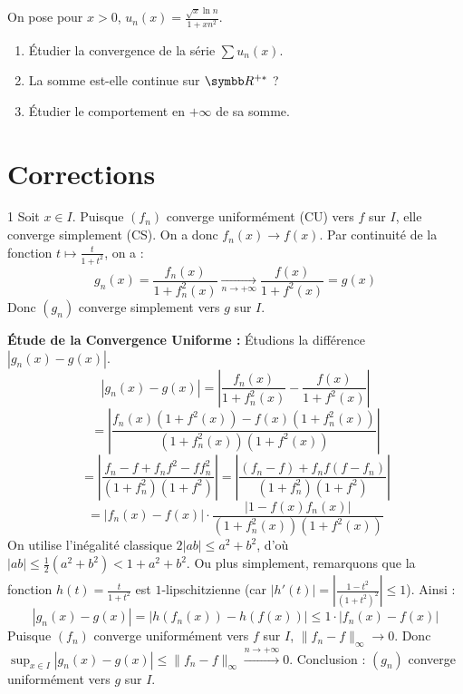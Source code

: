 \begin{exercice}
On pose pour $x>0$, $u_n(x) = \frac{\sqrt{x} \ln n}{1+x n^2}$.
\begin{enumerate}
    \item Étudier la convergence de la série $\sum u_n(x)$.
    \item La somme est-elle continue sur $\R^{+*}$ ?
    \item Étudier le comportement en $+\infty$ de sa somme.
\end{enumerate}
\end{exercice}

\newpage
\section{Corrections}

\begin{correction}{1}
Soit $x \in I$. Puisque $(f_n)$ converge uniformément (CU) vers $f$ sur $I$, elle converge simplement (CS).
On a donc $f_n(x) \to f(x)$.
Par continuité de la fonction $t \mapsto \frac{t}{1+t^2}$, on a :
$$ g_n(x) = \frac{f_n(x)}{1+f_n^2(x)} \xrightarrow[n\to+\infty]{} \frac{f(x)}{1+f^2(x)} = g(x) $$
Donc $(g_n)$ converge simplement vers $g$ sur $I$.

\textbf{Étude de la Convergence Uniforme :}
Étudions la différence $|g_n(x) - g(x)|$.
$$ |g_n(x) - g(x)| = \left| \frac{f_n(x)}{1+f_n^2(x)} - \frac{f(x)}{1+f^2(x)} \right| $$
$$ = \left| \frac{f_n(x)(1+f^2(x)) - f(x)(1+f_n^2(x))}{(1+f_n^2(x))(1+f^2(x))} \right| $$
$$ = \left| \frac{f_n - f + f_n f^2 - f f_n^2}{(1+f_n^2)(1+f^2)} \right| = \left| \frac{(f_n - f) + f_n f (f - f_n)}{(1+f_n^2)(1+f^2)} \right| $$
$$ = |f_n(x) - f(x)| \cdot \frac{|1 - f(x)f_n(x)|}{(1+f_n^2(x))(1+f^2(x))} $$
On utilise l'inégalité classique $2|ab| \le a^2 + b^2$, d'où $|ab| \le \frac{1}{2}(a^2+b^2) < 1+a^2+b^2$. Ou plus simplement, remarquons que la fonction $h(t) = \frac{t}{1+t^2}$ est $1$-lipschitzienne (car $|h'(t)| = |\frac{1-t^2}{(1+t^2)^2}| \le 1$).
Ainsi :
$$ |g_n(x) - g(x)| = |h(f_n(x)) - h(f(x))| \le 1 \cdot |f_n(x) - f(x)| $$
Puisque $(f_n)$ converge uniformément vers $f$ sur $I$, $\|f_n - f\|_\infty \to 0$.
Donc $\sup_{x \in I} |g_n(x) - g(x)| \le \|f_n - f\|_\infty \xrightarrow{n\to+\infty} 0$.
Conclusion : $(g_n)$ converge uniformément vers $g$ sur $I$.
\end{correction}


